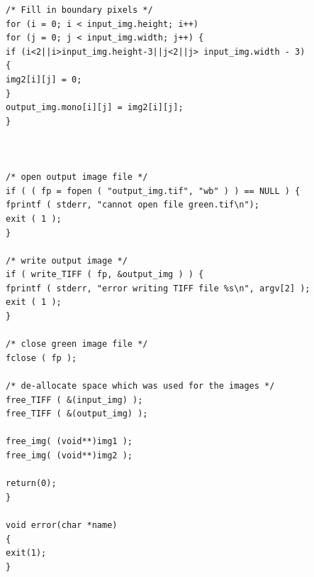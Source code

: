 \documentclass[paper=a4, fontsize=11pt]{scrartcl} %
\numberwithin{equation}{section} %
\numberwithin{figure}{section} %
\numberwithin{table}{section} %
\begin{document}
\begin{lstlisting}
/* Fill in boundary pixels */
for (i = 0; i < input_img.height; i++)
for (j = 0; j < input_img.width; j++) {
if (i<2||i>input_img.height-3||j<2||j> input_img.width - 3)
{
img2[i][j] = 0;
}
output_img.mono[i][j] = img2[i][j];
}



/* open output image file */
if ( ( fp = fopen ( "output_img.tif", "wb" ) ) == NULL ) {
fprintf ( stderr, "cannot open file green.tif\n");
exit ( 1 );
}

/* write output image */
if ( write_TIFF ( fp, &output_img ) ) {
fprintf ( stderr, "error writing TIFF file %s\n", argv[2] );
exit ( 1 );
}

/* close green image file */
fclose ( fp );

/* de-allocate space which was used for the images */
free_TIFF ( &(input_img) );
free_TIFF ( &(output_img) );

free_img( (void**)img1 );
free_img( (void**)img2 );  

return(0);
}

void error(char *name)
{
exit(1);
}


\end{lstlisting}
 

	
	
	

	
\end{document}
